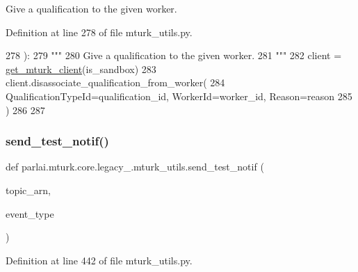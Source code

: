 \begin{DoxyVerb}Give a qualification to the given worker.
\end{DoxyVerb}
 

Definition at line 278 of file mturk\+\_\+utils.\+py.


\begin{DoxyCode}
278 ):
279     \textcolor{stringliteral}{"""}
280 \textcolor{stringliteral}{    Give a qualification to the given worker.}
281 \textcolor{stringliteral}{    """}
282     client = \hyperlink{namespaceparlai_1_1mturk_1_1core_1_1mturk__utils_a577e2527c04682284394b0951a090695}{get\_mturk\_client}(is\_sandbox)
283     client.disassociate\_qualification\_from\_worker(
284         QualificationTypeId=qualification\_id, WorkerId=worker\_id, Reason=reason
285     )
286 
287 
\end{DoxyCode}
\mbox{\label{namespaceparlai_1_1mturk_1_1core_1_1legacy__2018_1_1mturk__utils_a6567af08013cf893310b91b3e1a946e5}} 
\subsubsection{\texorpdfstring{send\+\_\+test\+\_\+notif()}{send\_test\_notif()}}
{\footnotesize\ttfamily def parlai.\+mturk.\+core.\+legacy\+\_.\+mturk\+\_\+utils.\+send\+\_\+test\+\_\+notif (\begin{DoxyParamCaption}\item[{}]{topic\+\_\+arn,  }\item[{}]{event\+\_\+type }\end{DoxyParamCaption})}



Definition at line 442 of file mturk\+\_\+utils.\+py.


